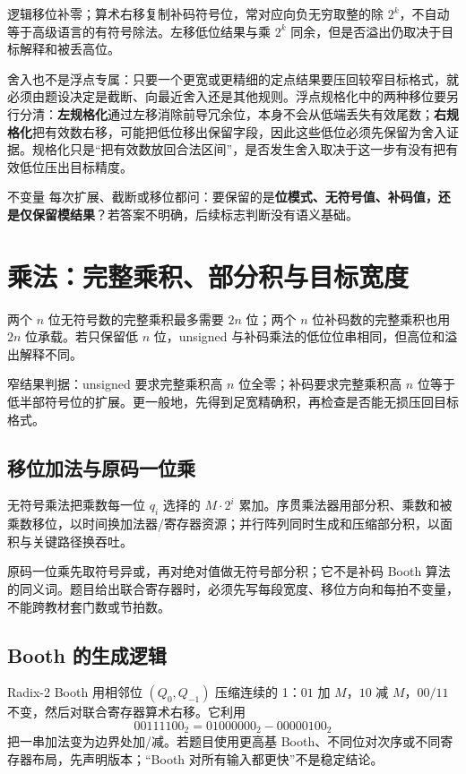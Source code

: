 \documentclass[UTF8,fontset=fandol,11pt,a4paper]{ctexart}
\newcommand{\kw}[1]{\textbf{\color{deep}#1}}
\begin{document}
逻辑移位补零；算术右移复制补码符号位，常对应向负无穷取整的除 $2^k$，不自动等于高级语言的有符号除法。左移低位结果与乘 $2^k$ 同余，但是否溢出仍取决于目标解释和被丢高位。

舍入也不是浮点专属：只要一个更宽或更精细的定点结果要压回较窄目标格式，就必须由题设决定是截断、向最近舍入还是其他规则。浮点规格化中的两种移位要另行分清：\kw{左规格化}通过左移消除前导冗余位，本身不会从低端丢失有效尾数；\kw{右规格化}把有效数右移，可能把低位移出保留字段，因此这些低位必须先保留为舍入证据。规格化只是“把有效数放回合法区间”，是否发生舍入取决于这一步有没有把有效低位压出目标精度。

\begin{methodbox}{不变量}
每次扩展、截断或移位都问：要保留的是\kw{位模式、无符号值、补码值，还是仅保留模结果}？若答案不明确，后续标志判断没有语义基础。
\end{methodbox}

\section{乘法：完整乘积、部分积与目标宽度}
两个 $n$ 位无符号数的完整乘积最多需要 $2n$ 位；两个 $n$ 位补码数的完整乘积也用 $2n$ 位承载。若只保留低 $n$ 位，unsigned 与补码乘法的低位位串相同，但高位和溢出解释不同。

窄结果判据：unsigned 要求完整乘积高 $n$ 位全零；补码要求完整乘积高 $n$ 位等于低半部符号位的扩展。更一般地，先得到足宽精确积，再检查是否能无损压回目标格式。

\subsection{移位加法与原码一位乘}
无符号乘法把乘数每一位 $q_i$ 选择的 $M\cdot2^i$ 累加。序贯乘法器用部分积、乘数和被乘数移位，以时间换加法器/寄存器资源；并行阵列同时生成和压缩部分积，以面积与关键路径换吞吐。

原码一位乘先取符号异或，再对绝对值做无符号部分积；它不是补码 Booth 算法的同义词。题目给出联合寄存器时，必须先写每段宽度、移位方向和每拍不变量，不能跨教材套门数或节拍数。

\subsection{Booth 的生成逻辑}
Radix-2 Booth 用相邻位 $(Q_0,Q_{-1})$ 压缩连续的 1：$01$ 加 $M$，$10$ 减 $M$，$00/11$ 不变，然后对联合寄存器算术右移。它利用
\[
00111100_2=01000000_2-00000100_2
\]
把一串加法变为边界处加/减。若题目使用更高基 Booth、不同位对次序或不同寄存器布局，先声明版本；“Booth 对所有输入都更快”不是稳定结论。
\end{document}
